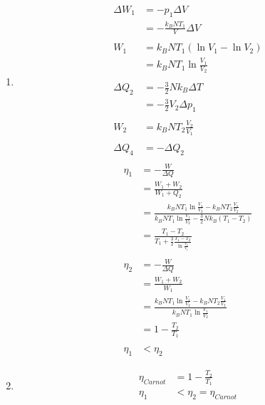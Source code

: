 \documentclass[11pt,letterpaper]{article}
\begin{document}
\begin{enumerate}
\begin{enumerate}
            \item 
            \begin{align*}
                \Delta W_1 &= -p_1 \Delta V\\
                &= -\frac{k_B N T_1}{V} \Delta V\\
                \\
                W_1 &= k_B N T_1 (\ln {V_1} - \ln{V_2}) \\
                &= k_B N T_1 \ln {\frac{V_1}{V_2}} \\
                \\
                \Delta Q _2 &= -\frac{3}{2}N k_B \Delta T \\
                &= -\frac{3}{2} V_2 \Delta p_1 \\
                \\
                W_2 &= k_B N T_2  {\frac{V_2}{V_1}} \\
                \\
                \Delta Q _4 &= - \Delta Q_2 \\
                \end{align*}
                \begin{align*}
                \eta_1 &= -\frac{W}{\Delta Q}\\
                &= \frac{W_1 + W_2}{W_1 + Q_2}\\
                &= \frac{k_B N T_1 \ln {\frac{V_1}{V_2}} - k_B N T_2  {\frac{V_1}{V_2}}}
                {k_B N T_1 \ln {\frac{V_1}{V_2}} - \frac{3}{2} N k_B (T_1 -T_2)}\\
                &= \frac{  T_1  -T_2 }
                {T_1  + \frac{3}{2} \frac{T_1 - T_2}{\ln {\frac{V_2}{V_1}}}}\\
                \\
                \eta_2 &= -\frac{W}{\Delta Q}\\
                &= \frac{W_1 + W_2}{W_1}\\
                &= \frac{k_B N T_1 \ln {\frac{V_1}{V_2}} - k_B N T_2  {\frac{V_1}{V_2}}}
                {k_B N T_1 \ln {\frac{V_1}{V_2}}}\\
                &= 1 - \frac{T_2}{T_1}\\
                \\
                \eta _1  &< \eta_2
            \end{align*}

            \item 
            \begin{align*}
                \eta_{Carnot} &=  1 - \frac{T_2}{T_1}\\
                \eta _1  &< \eta_2 = \eta_{Carnot}\\
            \end{align*}
            
        \end{enumerate}
\end{enumerate}
\end{document}
